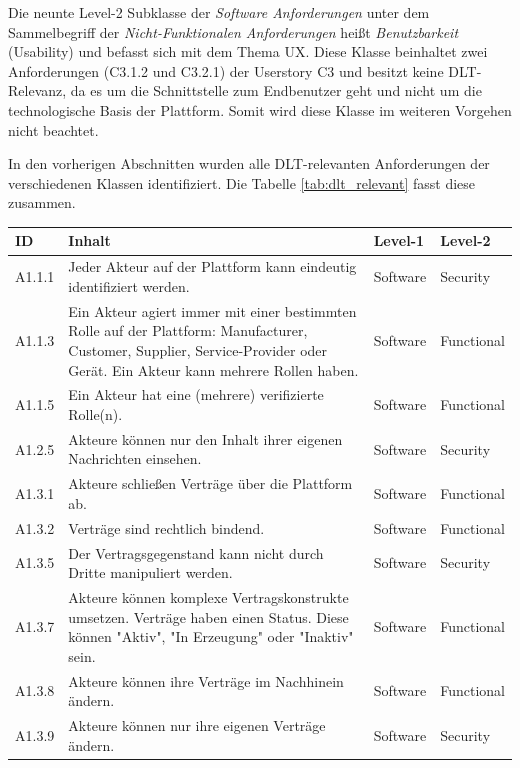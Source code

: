 Die neunte Level-2 Subklasse der \textit{Software Anforderungen} unter dem Sammelbegriff der \textit{Nicht-Funktionalen Anforderungen} heißt \textit{Benutzbarkeit} (Usability) und befasst sich mit dem Thema \ac{UX}. Diese Klasse beinhaltet zwei Anforderungen (C3.1.2 und C3.2.1) der Userstory C3 und besitzt keine \ac{DLT}-Relevanz, da es um die Schnittstelle zum Endbenutzer geht und nicht um die technologische Basis der Plattform. Somit wird diese Klasse im weiteren Vorgehen nicht beachtet.


In den vorherigen Abschnitten wurden alle \ac{DLT}-relevanten Anforderungen der verschiedenen Klassen identifiziert. Die Tabelle \ref{tab:dlt_relevant} fasst diese zusammen.

\begin{table}[]
\begin{tabu} to \textwidth {XX[3]XX}
\toprule
\textbf{ID} & \textbf{Inhalt} & \textbf{Level-1} & \textbf{Level-2} \\ \midrule
A1.1.1 & Jeder Akteur auf der Plattform kann eindeutig identifiziert werden. & Software & Security \\
A1.1.3 & Ein Akteur agiert immer mit einer bestimmten Rolle auf der Plattform: Manufacturer, Customer, Supplier, Service-Provider oder Gerät. Ein Akteur kann mehrere Rollen haben. & Software & Functional \\
A1.1.5 & Ein Akteur hat eine (mehrere) verifizierte Rolle(n). & Software & Functional \\
A1.2.5 & Akteure können nur den Inhalt ihrer eigenen Nachrichten einsehen. & Software & Security \\
A1.3.1 & Akteure schließen Verträge über die Plattform ab. & Software & Functional \\
A1.3.2 & Verträge sind rechtlich bindend. & Software & Functional \\
A1.3.5 & Der Vertragsgegenstand kann nicht durch Dritte manipuliert werden. & Software & Security \\
A1.3.7 & Akteure können komplexe Vertragskonstrukte umsetzen. Verträge haben einen Status. Diese können "Aktiv", "In Erzeugung" oder "Inaktiv" sein. & Software & Functional \\
A1.3.8 & Akteure können ihre Verträge im Nachhinein ändern. & Software & Functional \\
A1.3.9 & Akteure können nur ihre eigenen Verträge ändern. & Software & Security \\

\end{tabu}
\end{table}
